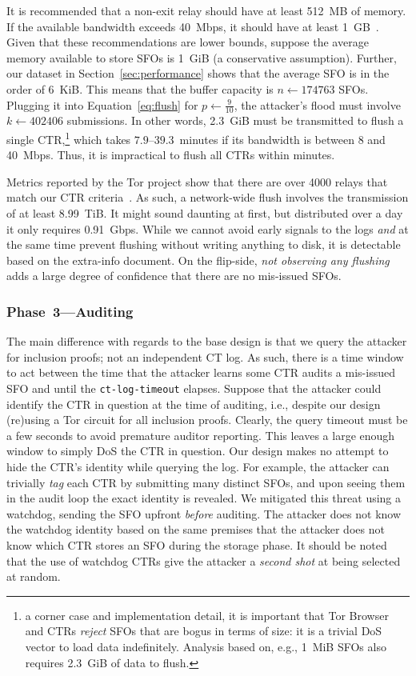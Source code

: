 It is recommended that a non-exit relay should have at least 512~MB of memory.
If the available bandwidth exceeds 40~Mbps, it should have at least
1~GB~\cite{relay-config}.  Given that these recommendations are lower bounds,
suppose the average memory available to store SFOs is 1~GiB (a conservative
assumption).  Further, our dataset in Section~\ref{sec:performance} shows that
the average SFO is in the order of 6~KiB.  This means that the buffer capacity
is $n \gets 174763$ SFOs. Plugging it into Equation~\ref{eq:flush} for $p \gets
\frac{9}{10}$, the attacker's flood must involve $k \gets 402406$ submissions.
In other words, 2.3~GiB must be transmitted to flush a single CTR,\footnote{%
a corner case and implementation detail, it is important that Tor Browser and
CTRs \emph{reject} SFOs that are bogus in terms of size: it is a trivial DoS
vector to load data indefinitely. Analysis based on, e.g., 1~MiB SFOs also
requires 2.3~GiB of data to flush.} which takes $7.9$--$39.3$~minutes if its
bandwidth is between 8 and 40~Mbps. Thus, it is impractical to flush all CTRs
within minutes.

Metrics reported by the Tor project show that there are over 4000 relays that
match our CTR criteria~\cite{relay-by-flag}.  As such, a network-wide flush
involves the transmission of at least 8.99~TiB.  It might sound daunting at
first, but distributed over a day it only requires 0.91~Gbps.  While we cannot
avoid early signals to the logs \emph{and} at the same time prevent flushing
without writing anything to disk, it is detectable based on the extra-info
document.  On the flip-side, \emph{not observing any flushing} adds a large
degree of confidence that there are no mis-issued SFOs.

\subsubsection{Phase~3---Auditing} \label{sec:auditor:analysis:phase3}
The main difference with regards to the base design is that we query the
attacker for inclusion proofs; not an independent CT log.  As such, there is a
time window to act between the time that the attacker learns some CTR audits a
mis-issued SFO and until the \texttt{ct-log-timeout} elapses.  Suppose that the
attacker could identify the CTR in question at the time of auditing, i.e.,
despite our design (re)using a Tor circuit for all inclusion proofs.  Clearly,
the query timeout must be a few seconds to avoid premature auditor reporting.
This leaves a large enough window to simply DoS the CTR in question.  Our design
makes no attempt to hide the CTR's identity while querying the log.  For
example, the attacker can trivially \emph{tag} each CTR by submitting many
distinct SFOs, and upon seeing them in the audit loop the exact identity is
revealed.  We mitigated this threat using a watchdog, sending the SFO upfront
\emph{before} auditing.  The attacker does not know the watchdog identity based
on the same premises that the attacker does not know which CTR stores an
SFO during the storage phase.  It should be noted that the use of watchdog CTRs
give the attacker a \emph{second shot} at being selected at random.

